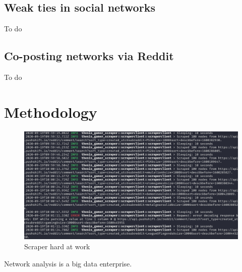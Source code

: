 \documentclass[12pt, a4paper]{article}
\begin{document}
\subsection{Weak ties in social networks}
To do\cite{granovetter1973}

\subsection{Co-posting networks via Reddit}
To do \cite{}

\section{Methodology}

\begin{figure}[h!]
  \includegraphics[width=\linewidth]{scraper_at_work.png}
  \caption{Scraper hard at work}
  \label{fig:workingscraper}
\end{figure}
Network analysis is a big data enterprise.

\printbibliography
\end{document}
